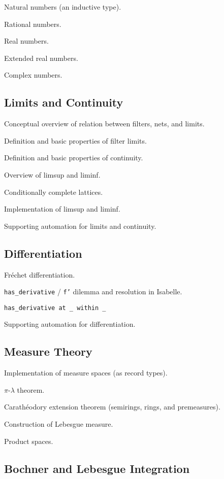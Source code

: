 \documentclass{amsart}
\theoremstyle{definition}
\theoremstyle{remark}
\begin{document}
Natural numbers (an inductive type).

Rational numbers.

Real numbers.

Extended real numbers.

Complex numbers.

\subsection{Limits and Continuity}

Conceptual overview of relation between filters, nets, and limits.

Definition and basic properties of filter limits.

Definition and basic properties of continuity.

Overview of limsup and liminf.

Conditionally complete lattices.

Implementation of limsup and liminf.

Supporting automation for limits and continuity.

\subsection{Differentiation}

Fr\'echet differentiation.

\texttt{has\_derivative} / \texttt{f'} dilemma and resolution in Isabelle.

\texttt{has\_derivative at \_ within \_}

Supporting automation for differentiation.

\subsection{Measure Theory}

Implementation of measure spaces (as record types).

$\pi$-$\lambda$ theorem.

Carath\'eodory extension theorem (semirings, rings, and premeasures).

Construction of Lebesgue measure.

Product spaces.

\subsection{Bochner and Lebesgue Integration}
\end{document}

